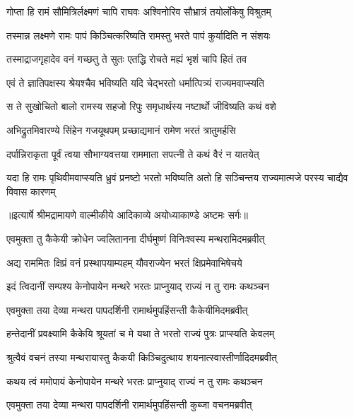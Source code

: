 \twolineshloka
{गोप्ता हि रामं सौमित्रिर्लक्ष्मणं चापि राघवः}
{अश्विनोरिव सौभ्रात्रं तयोर्लोकेषु विश्रुतम्} %

\twolineshloka
{तस्मान्न लक्ष्मणे रामः पापं किञ्चित्करिष्यति}
{रामस्तु भरते पापं कुर्यादिति न संशयः} %

\twolineshloka
{तस्माद्राजगृहादेव वनं गच्छतु ते सुतः}
{एतद्धि रोचते मह्यं भृशं चापि हितं तव} %

\twolineshloka
{एवं ते ज्ञातिपक्षस्य श्रेयश्चैव भविष्यति}
{यदि चेद्भरतो धर्मात्पित्र्यं राज्यमवाप्स्यति} %

\twolineshloka
{स ते सुखोचितो बालो रामस्य सहजो रिपुः}
{समृधार्थस्य नष्टार्थो जीविष्यति कथं वशे} %

\twolineshloka
{अभिद्रुतमिवारण्ये सिंहेन गजयूथपम्}
{प्रच्छाद्यमानं रामेण भरतं त्रातुमर्हसि} %

\twolineshloka
{दर्पान्निराकृता पूर्वं त्वया सौभाग्यवत्तया}
{राममाता सपत्नी ते कथं वैरं न यातयेत्} %

\fourlineindentedshloka
{यदा हि रामः पृथिवीमवाप्स्यति}
{ध्रुवं प्रनष्टो भरतो भविष्यति}
{अतो हि सञ्चिन्तय राज्यमात्मजे}
{परस्य चाद्यैव विवास कारणम्} %


{॥इत्यार्षे श्रीमद्रामायणे वाल्मीकीये आदिकाव्ये अयोध्याकाण्डे अष्टमः सर्गः॥}


\twolineshloka
{एवमुक्ता तु कैकेयी क्रोधेन ज्वलितानना}
{दीर्घमुष्णं विनिःश्वस्य मन्थरामिदमब्रवीत्} %

\twolineshloka
{अद्य राममितः क्षिप्रं वनं प्रस्थापयाम्यहम्}
{यौवराज्येन भरतं क्षिप्रमेवाभिषेचये} %

\twolineshloka
{इदं त्विदानीं सम्पश्य केनोपायेन मन्थरे}
{भरतः प्राप्नुयाद् राज्यं न तु रामः कथञ्चन} %

\twolineshloka
{एवमुक्ता तया देव्या मन्थरा पापदर्शिनी}
{रामार्थमुपहिंसन्ती कैकेयीमिदमब्रवीत्} %

\twolineshloka
{हन्तेदानीं प्रवक्ष्यामि कैकेयि श्रूयतां च मे}
{यथा ते भरतो राज्यं पुत्रः प्राप्स्यति केवलम्} %

\twolineshloka
{श्रुत्वैवं वचनं तस्या मन्थरायास्तु कैकयी}
{किञ्चिदुत्थाय शयनात्स्वास्तीर्णादिदमब्रवीत्} %

\twolineshloka
{कथय त्वं ममोपायं केनोपायेन मन्थरे}
{भरतः प्राप्नुयाद् राज्यं न तु रामः कथञ्चन} %

\twolineshloka
{एवमुक्ता तया देव्या मन्थरा पापदर्शिनी}
{रामार्थमुपहिंसन्ती कुब्जा वचनमब्रवीत्} %

